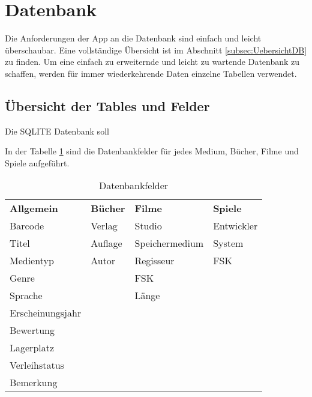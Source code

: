 \section{Datenbank}

Die Anforderungen der App an die Datenbank sind einfach und leicht überschaubar. Eine vollständige Übersicht ist im Abschnitt \ref{subsec:UebersichtDB} zu finden. Um eine einfach zu erweiternde und leicht zu wartende Datenbank zu schaffen, werden für immer wiederkehrende Daten einzelne Tabellen verwendet.

\subsection{Übersicht der Tables und Felder}
\label{sec:Felder}

Die SQLITE Datenbank soll 

In der Tabelle \ref{tab:Datenbankfelder}  sind die Datenbankfelder für jedes Medium, Bücher, Filme und Spiele aufgeführt.

\begin{table} [htbp]
	\begin{center}
		\begin{tabular}{|l|l|l|l|}
			\rowcolor{black} {\color{white}\textbf{Allgemein}} & {\color{white}\textbf{Bücher}} & {\color{white}\textbf{Filme}} & {\color{white}\textbf{Spiele}} \\
			Barcode & Verlag & Studio & Entwickler\\ \hline
			\rowcolor{DarkSeaGreen} Titel & Auflage & Speichermedium & System \\ \hline		
			Medientyp & Autor& Regisseur & FSK \\ \hline
			\rowcolor{DarkSeaGreen} Genre & & FSK & \\ \hline
			Sprache & & Länge & \\ \hline
			\rowcolor{DarkSeaGreen} Erscheinungsjahr & & & \\ \hline
			Bewertung & & & \\ \hline
			\rowcolor{DarkSeaGreen} Lagerplatz & & & \\ \hline
			Verleihstatus & & & \\ \hline
			\rowcolor{DarkSeaGreen} Bemerkung & & & \\ \hline		
		\end{tabular}
	\caption{Datenbankfelder}
	\label{tab:Datenbankfelder}
	\end{center}
\end{table}